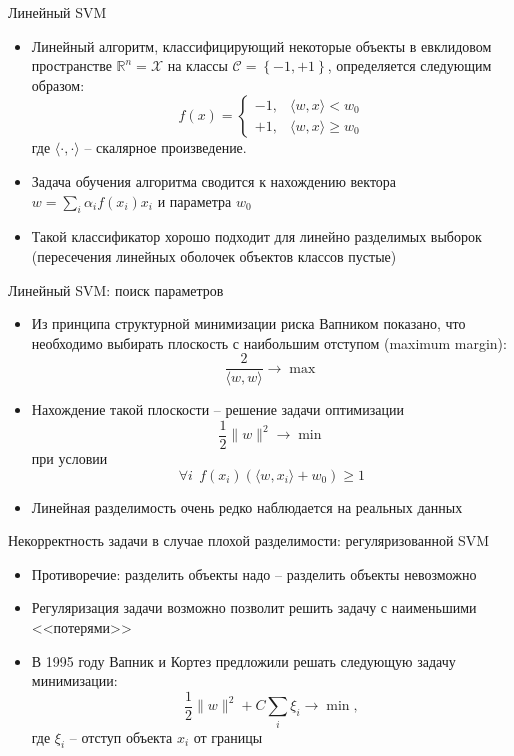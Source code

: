\documentclass[red,unicode]{beamer}
\begin{document}
\begin{frame}{Линейный SVM}
\begin{itemize}
	\item Линейный алгоритм, классифицирующий некоторые объекты в евклидовом пространстве $\mathbb{R}^n = \mathcal{X}$ на классы $\mathcal{C}=\left\{ -1, +1 \right\}$, определяется следующим образом:
$$
f (x) =
\begin{cases} 
-1, & \langle w, x \rangle < w_0 \\
+1, & \langle w, x \rangle \geq w_0  
\end{cases}
$$
где $\langle \cdot , \cdot \rangle$ -- скалярное произведение.
	\item Задача обучения алгоритма сводится к нахождению вектора $w=\sum_i \alpha_i f(x_i) x_i$ и параметра $w_0$
	\item Такой классификатор хорошо подходит для линейно разделимых выборок (пересечения линейных оболочек объектов классов пустые)
\end{itemize}
\end{frame}


\begin{frame}{Линейный SVM: поиск параметров}
\begin{itemize}
	\item Из принципа структурной минимизации риска Вапником показано, что необходимо выбирать плоскость с наибольшим отступом (maximum margin):
	$$
	\frac{2}{\langle w,w \rangle} \to \max
	$$
	\item Нахождение такой плоскости -- решение задачи оптимизации
	$$
\frac{1}{2} \| w \|^2  \to \min
$$
при условии
$$
\forall i ~~ f(x_i) (\langle w, x_i\rangle + w_0 ) \geqslant 1
$$
	\item Линейная разделимость очень редко наблюдается на реальных данных
\end{itemize}
\end{frame}



\begin{frame}{Некорректность задачи в случае плохой разделимости: регуляризованной SVM}
\begin{itemize}
	\item Противоречие: разделить объекты надо -- разделить объекты невозможно
	\item Регуляризация задачи возможно позволит решить задачу с наименьшими <<потерями>>
	\item В 1995 году Вапник и Кортез предложили решать следующую задачу минимизации:
$$
\frac{1}{2} \| w \|^2 + C \sum_i \xi_i \to \min,
$$
где $\xi_i$ -- отступ объекта $x_i$ от границы
\end{itemize}
\end{frame}
\end{document}
